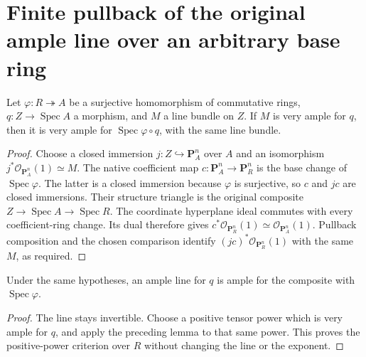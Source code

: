 \section{Finite pullback of the original ample line over an arbitrary base ring}

\begin{lemma}
\label{lem:kn-relative-very-ample-closed-base}
\leanok
{}
Let $\varphi:R\twoheadrightarrow A$ be a surjective homomorphism of
commutative rings, $q:Z\to\operatorname{Spec}A$ a morphism, and $M$ a
line bundle on $Z$. If $M$ is very ample for $q$, then it is very ample
for $\operatorname{Spec}\varphi\circ q$, with the same line bundle.
\end{lemma}
\begin{proof}
Choose a closed immersion $j:Z\hookrightarrow\mathbf P^n_A$ over $A$
and an isomorphism $j^*\mathcal O_{\mathbf P^n_A}(1)\simeq M$.
The native coefficient map $c:\mathbf P^n_A\to\mathbf P^n_R$ is the
base change of $\operatorname{Spec}\varphi$. The latter is a closed
immersion because $\varphi$ is surjective, so $c$ and $jc$ are closed
immersions. Their structure triangle is the original composite
$Z\to\operatorname{Spec}A\to\operatorname{Spec}R$.
The coordinate hyperplane ideal commutes with every coefficient-ring
change. Its dual therefore gives
$c^*\mathcal O_{\mathbf P^n_R}(1)\simeq\mathcal O_{\mathbf P^n_A}(1)$.
Pullback composition and the chosen comparison identify
$(jc)^*\mathcal O_{\mathbf P^n_R}(1)$ with the same $M$, as required.
\end{proof}

\begin{corollary}
\label{cor:kn-relative-ample-closed-base}
\leanok
{}
Under the same hypotheses, an ample line for $q$ is ample for the
composite with $\operatorname{Spec}\varphi$.
\end{corollary}
\begin{proof}
The line stays invertible. Choose a positive tensor power which is
very ample for $q$, and apply the preceding lemma to that same power.
This proves the positive-power criterion over $R$ without changing
the line or the exponent.
\end{proof}


